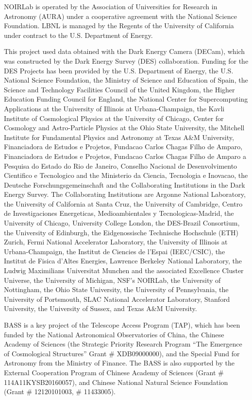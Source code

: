 \documentclass[modern,linenumbers]{aastex701}
\begin{document}
\begin{acknowledgements}
NOIRLab is operated by the Association of Universities for Research in
Astronomy (AURA) under a cooperative agreement with the National
Science Foundation. LBNL is managed by the Regents of the University
of California under contract to the U.S. Department of Energy.

This project used data obtained with the Dark Energy Camera (DECam),
which was constructed by the Dark Energy Survey (DES)
collaboration. Funding for the DES Projects has been provided by the
U.S. Department of Energy, the U.S. National Science Foundation, the
Ministry of Science and Education of Spain, the Science and Technology
Facilities Council of the United Kingdom, the Higher Education Funding
Council for England, the National Center for Supercomputing
Applications at the University of Illinois at Urbana-Champaign, the
Kavli Institute of Cosmological Physics at the University of Chicago,
Center for Cosmology and Astro-Particle Physics at the Ohio State
University, the Mitchell Institute for Fundamental Physics and
Astronomy at Texas A\&M University, Financiadora de Estudos e
Projetos, Fundacao Carlos Chagas Filho de Amparo, Financiadora de
Estudos e Projetos, Fundacao Carlos Chagas Filho de Amparo a Pesquisa
do Estado do Rio de Janeiro, Conselho Nacional de Desenvolvimento
Cientifico e Tecnologico and the Ministerio da Ciencia, Tecnologia e
Inovacao, the Deutsche Forschungsgemeinschaft and the Collaborating
Institutions in the Dark Energy Survey. The Collaborating Institutions
are Argonne National Laboratory, the University of California at Santa
Cruz, the University of Cambridge, Centro de Investigaciones
Energeticas, Medioambientales y Tecnologicas-Madrid, the University of
Chicago, University College London, the DES-Brazil Consortium, the
University of Edinburgh, the Eidgenossische Technische Hochschule
(ETH) Zurich, Fermi National Accelerator Laboratory, the University of
Illinois at Urbana-Champaign, the Institut de Ciencies de l’Espai
(IEEC/CSIC), the Institut de Fisica d’Altes Energies, Lawrence
Berkeley National Laboratory, the Ludwig Maximilians Universitat
Munchen and the associated Excellence Cluster Universe, the University
of Michigan, NSF’s NOIRLab, the University of Nottingham, the Ohio
State University, the University of Pennsylvania, the University of
Portsmouth, SLAC National Accelerator Laboratory, Stanford University,
the University of Sussex, and Texas A\&M University.

BASS is a key project of the Telescope Access Program (TAP), which has
been funded by the National Astronomical Observatories of China, the
Chinese Academy of Sciences (the Strategic Priority Research Program
“The Emergence of Cosmological Structures” Grant \# XDB09000000), and
the Special Fund for Astronomy from the Ministry of Finance. The BASS
is also supported by the External Cooperation Program of Chinese
Academy of Sciences (Grant \# 114A11KYSB20160057), and Chinese National
Natural Science Foundation (Grant \# 12120101003, \# 11433005).


\end{acknowledgements}
\end{document}
